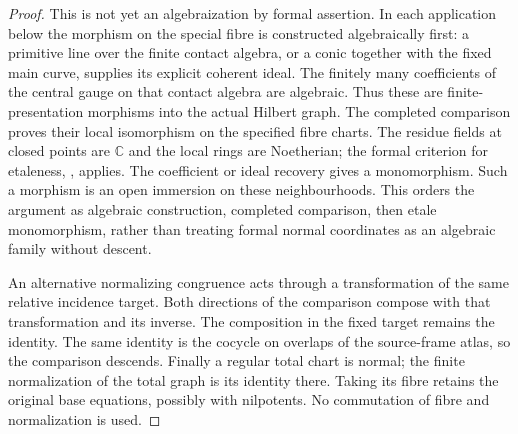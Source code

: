 \documentclass[11pt,reqno]{amsart}
\numberwithin{equation}{section}
\theoremstyle{definition}\newtheorem{definition}[theorem]{Definition}
\theoremstyle{remark}\newtheorem{remark}[theorem]{Remark}
\newcommand{\C}{\mathbb C}\newcommand{\Q}{\mathbb Q}
\begin{document}
\begin{proof}
This is not yet an algebraization by formal assertion. In each
application below the morphism on the special fibre is constructed
algebraically first: a primitive line over the finite contact
algebra, or a conic together with the fixed main curve, supplies
its explicit coherent ideal. The finitely many coefficients of
the central gauge on that contact algebra are algebraic. Thus
these are finite-presentation morphisms into the actual Hilbert
graph. The completed comparison proves their local isomorphism
on the specified fibre charts. The residue fields at closed
points are $\C$ and the local rings are Noetherian; the formal
criterion for etaleness, \cite[Lemma~41.11.3]{Stacks163}, applies.
The coefficient or ideal recovery gives a monomorphism. Such a
morphism is an open immersion on these neighbourhoods. This orders
the argument as algebraic construction, completed comparison, then
etale monomorphism, rather than treating formal normal coordinates
as an algebraic family without descent.

An alternative normalizing congruence acts through a transformation
of the same relative incidence target. Both directions of the
comparison compose with that transformation and its inverse. The
composition in the fixed target remains the identity. The same
identity is the cocycle on overlaps of the source-frame atlas, so
the comparison descends. Finally a regular total chart is normal;
the finite normalization of the total graph is its identity there.
Taking its fibre retains the original base equations, possibly
with nilpotents. No commutation of fibre and normalization is used.
\end{proof}
\end{document}
